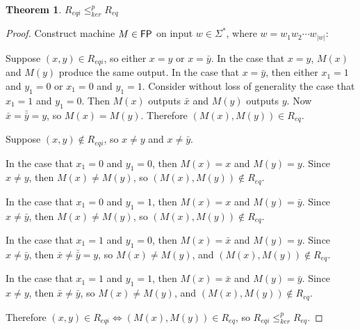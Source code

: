 \documentclass{amsart}
\newtheorem{theorem}{Theorem}[section]
\theoremstyle{definition} \newtheorem{definition}[definition]{Definition}
\newcommand{\sigmastar}{\Sigma^{*}} %
\newcommand{\kr}{\leq^{p}_{ker}} %
\begin{document}
\begin{theorem}\label{thm:reqi_req}$R_{eqi}\kr R_{eq}$\end{theorem}
\begin{proof}
  Construct machine $M\in{\ensuremath{\mathsf{FP}}}$ on input $w\in\sigmastar$, where
  $w=w_1w_2\cdots w_{|w|}$:\\
  \begin{algorithm}[H]
  \end{algorithm}
  
  Suppose $(x,y)\in R_{eqi}$, so either $x=y$ or $x=\bar{y}$. In the case that
  $x=y$, $M(x)$ and $M(y)$ produce the same output. In the case that
  $x=\bar{y}$, then either $x_1=1$ and $y_1=0$ or $x_1=0$ and $y_1=1$. Consider
  without loss of generality the case that $x_1=1$ and $y_1=0$. Then $M(x)$
  outputs $\bar{x}$ and $M(y)$ outputs $y$. Now $\bar{x}=\bar{\bar{y}}=y$, so
  $M(x)=M(y)$. Therefore $(M(x),M(y))\in R_{eq}$.

  Suppose $(x,y)\notin R_{eqi}$, so $x\neq y$ and $x\neq\bar{y}$. 

  In the case that $x_1=0$ and $y_1=0$, then $M(x)=x$ and $M(y)=y$. Since
  $x\neq y$, then $M(x)\neq M(y)$, so $(M(x),M(y))\notin R_{eq}$.

  In the case that $x_1=0$ and $y_1=1$, then $M(x)=x$ and $M(y)=\bar{y}$. Since
  $x\neq\bar{y}$, then $M(x)\neq M(y)$, so $(M(x),M(y))\notin R_{eq}$.

  In the case that $x_1=1$ and $y_1=0$, then $M(x)=\bar{x}$ and $M(y)=y$. Since
  $x\neq\bar{y}$, then $\bar{x}\neq \bar{\bar{y}}=y$, so $M(x)\neq M(y)$, and
  $(M(x),M(y))\notin R_{eq}$. 

  In the case that $x_1=1$ and $y_1=1$, then $M(x)=\bar{x}$ and
  $M(y)=\bar{y}$. Since $x\neq y$, then $\bar{x}\neq\bar{y}$, so $M(x)\neq
  M(y)$, and $(M(x),M(y))\notin R_{eq}$.

  Therefore $(x,y)\in R_{eqi}\iff (M(x), M(y))\in R_{eq}$, so $R_{eqi}\kr
  R_{eq}$.
\end{proof}
\end{document}
